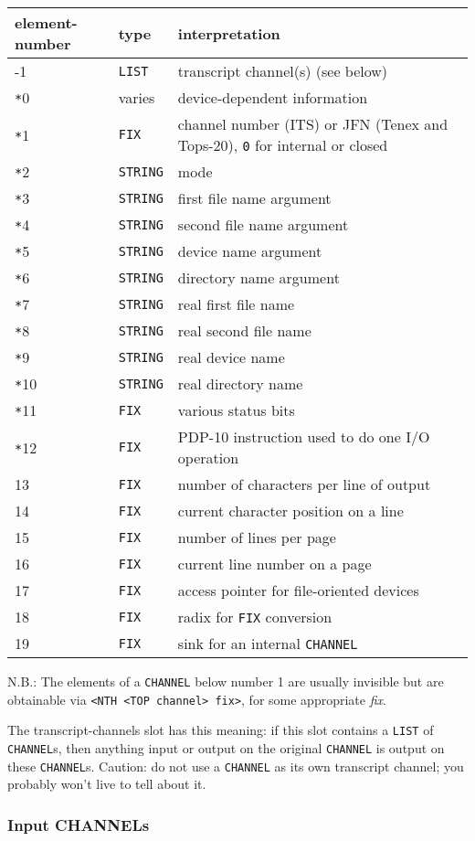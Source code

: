 \documentclass[a4paper]{scrbook}
\begin{document}
\begin{longtable}[]{@{}lll@{}}
\toprule
element-number & type & interpretation\tabularnewline
\midrule
\endhead
-1 & \texttt{LIST} & transcript channel(s) (see below)\tabularnewline
\texttt{*}0 & varies & device-dependent information\tabularnewline
\texttt{*}1 & \texttt{FIX} & channel number (ITS) or JFN (Tenex and Tops-20), \texttt{0} for internal or
closed\tabularnewline
\texttt{*}2 & \texttt{STRING} & mode\tabularnewline
\texttt{*}3 & \texttt{STRING} & first file name argument\tabularnewline
\texttt{*}4 & \texttt{STRING} & second file name argument\tabularnewline
\texttt{*}5 & \texttt{STRING} & device name argument\tabularnewline
\texttt{*}6 & \texttt{STRING} & directory name argument\tabularnewline
\texttt{*}7 & \texttt{STRING} & real first file name\tabularnewline
\texttt{*}8 & \texttt{STRING} & real second file name\tabularnewline
\texttt{*}9 & \texttt{STRING} & real device name\tabularnewline
\texttt{*}10 & \texttt{STRING} & real directory name\tabularnewline
\texttt{*}11 & \texttt{FIX} & various status bits\tabularnewline
\texttt{*}12 & \texttt{FIX} & PDP-10 instruction used to do one I/O operation\tabularnewline
13 & \texttt{FIX} & number of characters per line of output\tabularnewline
14 & \texttt{FIX} & current character position on a line\tabularnewline
15 & \texttt{FIX} & number of lines per page\tabularnewline
16 & \texttt{FIX} & current line number on a page\tabularnewline
17 & \texttt{FIX} & access pointer for file-oriented devices\tabularnewline
18 & \texttt{FIX} & radix for \texttt{FIX} conversion\tabularnewline
19 & \texttt{FIX} & sink for an internal \texttt{CHANNEL}\tabularnewline
\bottomrule
\end{longtable}

N.B.: The elements of a \texttt{CHANNEL} below number 1 are usually invisible but are obtainable via
\texttt{\textless{}NTH\ \textless{}TOP\ channel\textgreater{}\ fix\textgreater{}}, for some appropriate \emph{fix}.

The transcript-channels slot has this meaning: if this slot contains a \texttt{LIST} of \texttt{CHANNEL}s, then anything
input or output on the original \texttt{CHANNEL} is output on these \texttt{CHANNEL}s. Caution: do not use a
\texttt{CHANNEL} as its own transcript channel; you probably won't live to tell about it.

\subsubsection{Input CHANNELs}\label{input-channels}
\end{document}
